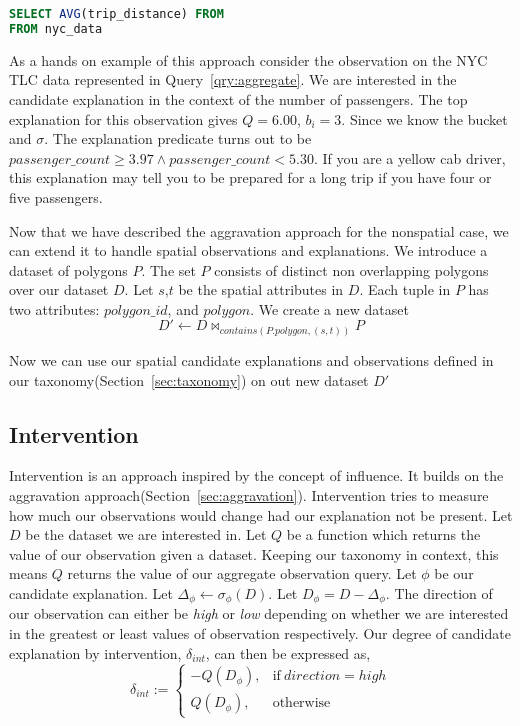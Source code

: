 \renewcommand{\lstlistingname}{Query}%
\begin{lstlisting}[language=SQL, caption=Aggregate Query for average tip percentage, label=qry:aggregate]
SELECT AVG(trip_distance) FROM
FROM nyc_data
\end{lstlisting}

As a hands on example of this approach consider the observation on the NYC TLC data represented in Query~\ref{qry:aggregate}. We are interested in the candidate explanation in the context of the number of passengers. The top explanation for this observation gives $Q=6.00$, $b_i=3$. Since we know the bucket and $\sigma$. The explanation predicate turns out to be $passenger\_count \geq 3.97 \wedge passenger\_count < 5.30$. If you are a yellow cab driver, this explanation may tell you to be prepared for a long trip if you have four or five passengers.

Now that we have described the aggravation approach for the nonspatial case, we can extend it to handle spatial observations and explanations. We introduce a dataset of polygons $P$. The set $P$ consists of distinct non overlapping polygons over our dataset $D$. Let $s$,$t$ be the spatial attributes in $D$. Each tuple in $P$ has two attributes: $polygon\_id$, and $polygon$. We create a new dataset
$$D' \leftarrow D \bowtie_{contains(P.polygon,(s,t))} P$$

Now we can use our spatial candidate explanations and observations defined in our taxonomy(Section~\ref{sec:taxonomy}) on out new dataset $D'$

\subsection{Intervention}
\label{sec:intervention}

Intervention is an approach inspired by the concept of influence. It builds on the aggravation approach(Section~\ref{sec:aggravation}). Intervention tries to measure how much our observations would change had our explanation not be present. Let $D$ be the dataset we are interested in. Let $Q$ be a function which returns the value of our observation given a dataset. Keeping our taxonomy in context, this means $Q$ returns the value of our aggregate observation query. Let $\phi$ be our candidate explanation. Let $\Delta_\phi \leftarrow \sigma_\phi(D)$. Let $D_\phi = D - \Delta_\phi$. The direction of our observation can either be \textit{high} or \textit{low} depending on whether we are interested in the greatest or least values of observation respectively. Our degree of candidate explanation by intervention, $\delta_{int}$, can then be expressed as,
\begin{equation}
\delta_{int}:=
    \begin{cases}
        -Q(D_\phi), & \text{if}\ direction=high \\
        Q(D_\phi), & \text{otherwise}
    \end{cases}
\end{equation}

